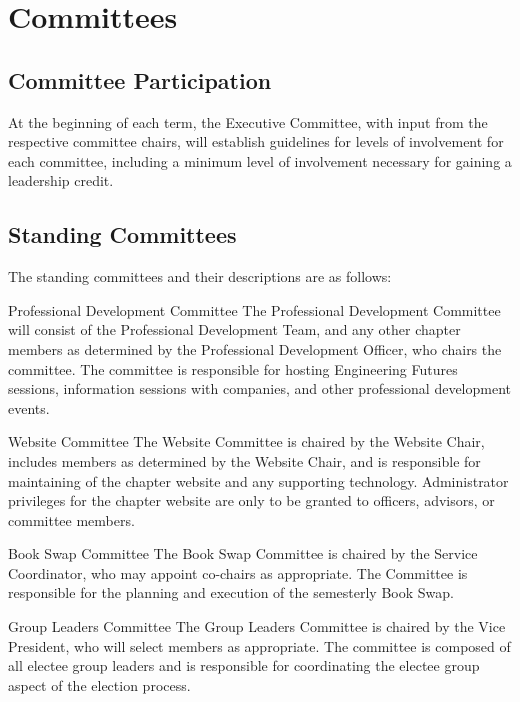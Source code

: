 

\chapter{Committees}\label{sec:committees}%
\section{Committee Participation}\label{sec:commPart} At the beginning of each term, the Executive Committee, with input from the respective committee chairs, will establish guidelines for levels of involvement for each committee, including a minimum level of involvement necessary for gaining a leadership credit.
\section{Standing Committees}\label{sec:standingCommittees} The standing committees and their descriptions are as follows:
\begin{enumsubsection}
	\item{Professional Development Committee} The Professional Development Committee will consist of the Professional Development Team, and any other chapter members as determined by the Professional Development Officer, who chairs the committee. The committee is responsible for hosting Engineering Futures sessions, information sessions with companies, and other professional development events.
	\item{Website Committee} The Website Committee is chaired by the Website Chair, includes members as determined by the Website Chair, and is responsible for maintaining of the chapter website and any supporting technology. Administrator privileges for the chapter website are only to be granted to officers, advisors, or committee members.
	\item{Book Swap Committee} The Book Swap Committee is chaired by the Service Coordinator, who may appoint co-chairs as appropriate. The Committee is responsible for the planning and execution of the semesterly Book Swap.
	\item{Group Leaders Committee} The Group Leaders Committee is chaired by the Vice President, who will select members as appropriate. The committee is composed of all electee group leaders and is responsible for coordinating the electee group aspect of the election process.
\end{enumsubsection}


